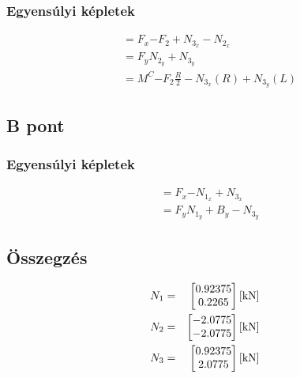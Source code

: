\subsubsection{Egyensúlyi képletek}
\begin{align*}
    &\equal{F_x}{- F_2 + N_{3_x} - N_{2_x}} \\
    &\equal{F_y}{N_{2_y} + N_{3_y}} \\
    &\equal{M^C}{-F_2 \frac{R}{2} - N_{3_x} (R) + N_{3_y} (L)}
\end{align*}

\newpage

\subsection{B pont}

\sztab

\subsubsection{Egyensúlyi képletek}
\begin{align*}
    &\equal{F_x}{-N_{1_x} + N_{3_x}} \\
    &\equal{F_y}{N_{1_y} + B_y - N_{3_y}}
\end{align*}

\subsection{Összegzés}
\begin{align*}
	N_1 &= &\begin{bmatrix}
		0.92375 \\
		0.2265
	\end{bmatrix} \SI{}{[\kilo\newton]}\\
	N_2 &= &\begin{bmatrix}
		-2.0775 \\
		-2.0775
	\end{bmatrix} \SI{}{[\kilo\newton]}\\
	N_3 &= &\begin{bmatrix}
		0.92375 \\
		2.0775
	\end{bmatrix} \SI{}{[\kilo\newton]}\\
\end{align*}
